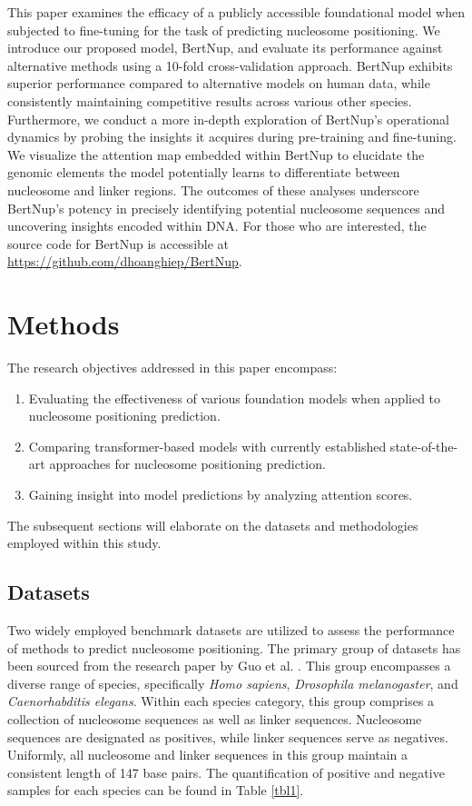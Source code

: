\documentclass[a4paper,fleqn]{cas-dc}
\begin{document}
This paper examines the efficacy of a publicly accessible foundational model when subjected to fine-tuning for the task of predicting nucleosome positioning. We introduce our proposed model, BertNup, and evaluate its performance against alternative methods using a 10-fold cross-validation approach. BertNup exhibits superior performance compared to alternative models on human data, while consistently maintaining competitive results across various other species. Furthermore, we conduct a more in-depth exploration of BertNup's operational dynamics by probing the insights it acquires during pre-training and fine-tuning. We visualize the attention map embedded within BertNup to elucidate the genomic elements the model potentially learns to differentiate between nucleosome and linker regions. The outcomes of these analyses underscore BertNup's potency in precisely identifying potential nucleosome sequences and uncovering insights encoded within DNA. For those who are interested, the source code for BertNup is accessible at \url{https://github.com/dhoanghiep/BertNup}.

\section{Methods}

The research objectives addressed in this paper encompass:

\begin{enumerate}[1.]
    \item Evaluating the effectiveness of various foundation models when applied to nucleosome positioning prediction.
    \item Comparing transformer-based models with currently established state-of-the-art approaches for nucleosome positioning prediction.
    \item Gaining insight into model predictions by analyzing attention scores.
\end{enumerate}

The subsequent sections will elaborate on the datasets and methodologies employed within this study.

\subsection{Datasets}

Two widely employed benchmark datasets are utilized to assess the performance of methods to predict nucleosome positioning. The primary group of datasets has been sourced from the research paper by Guo et al. \cite{Guo2014}. This group encompasses a diverse range of species, specifically \textit{Homo sapiens}, \textit{Drosophila melanogaster}, and \textit{Caenorhabditis elegans}. Within each species category, this group comprises a collection of nucleosome sequences as well as linker sequences. Nucleosome sequences are designated as positives, while linker sequences serve as negatives. Uniformly, all nucleosome and linker sequences in this group maintain a consistent length of 147 base pairs. The quantification of positive and negative samples for each species can be found in Table \ref{tbl1}. 
\end{document}
